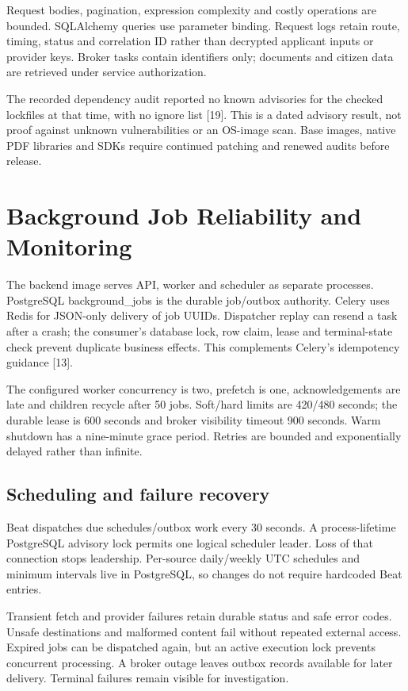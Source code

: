 \documentclass[12pt,a4paper,twoside]{report}
\begin{document}
Request bodies, pagination, expression complexity and costly operations are bounded. SQLAlchemy queries use parameter binding. Request logs retain route, timing, status and correlation ID rather than decrypted applicant inputs or provider keys. Broker tasks contain identifiers only; documents and citizen data are retrieved under service authorization.

The recorded dependency audit reported no known advisories for the checked lockfiles at that time, with no ignore list [19]. This is a dated advisory result, not proof against unknown vulnerabilities or an OS-image scan. Base images, native PDF libraries and SDKs require continued patching and renewed audits before release.

\section{Background Job Reliability and Monitoring}

The backend image serves API, worker and scheduler as separate processes. PostgreSQL background\_jobs is the durable job/outbox authority. Celery uses Redis for JSON-only delivery of job UUIDs. Dispatcher replay can resend a task after a crash; the consumer's database lock, row claim, lease and terminal-state check prevent duplicate business effects. This complements Celery's idempotency guidance [13].

The configured worker concurrency is two, prefetch is one, acknowledgements are late and children recycle after 50 jobs. Soft/hard limits are 420/480 seconds; the durable lease is 600 seconds and broker visibility timeout 900 seconds. Warm shutdown has a nine-minute grace period. Retries are bounded and exponentially delayed rather than infinite.

\subsection*{Scheduling and failure recovery}

Beat dispatches due schedules/outbox work every 30 seconds. A process-lifetime PostgreSQL advisory lock permits one logical scheduler leader. Loss of that connection stops leadership. Per-source daily/weekly UTC schedules and minimum intervals live in PostgreSQL, so changes do not require hardcoded Beat entries.

Transient fetch and provider failures retain durable status and safe error codes. Unsafe destinations and malformed content fail without repeated external access. Expired jobs can be dispatched again, but an active execution lock prevents concurrent processing. A broker outage leaves outbox records available for later delivery. Terminal failures remain visible for investigation.
\end{document}
